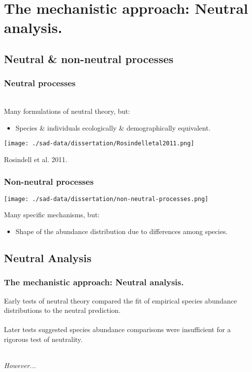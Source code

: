 \documentclass[14pt]{beamer}
\begin{document}
\section{The mechanistic approach: Neutral analysis.}
\subsection{Neutral & non-neutral processes}
\begin{frame}[t]
\frametitle{Neutral processes}
~\\
Many formulations of neutral theory, but:
~\\
\begin{itemize}
\item Species \& individuals ecologically \& demographically equivalent.\\
\end{itemize}
\texttt{[image: ./sad-data/dissertation/Rosindelletal2011.png]}\\
\begin{tiny}
Rosindell et al. 2011.
\end{tiny}
\end{frame}

\begin{frame}[t]
\frametitle{Non-neutral processes}
\begin{center}
\texttt{[image: ./sad-data/dissertation/non-neutral-processes.png]}\\
\end{center}
Many specific mechanisms, but:
~\\
\begin{itemize}
\item Shape of the abundance distribution due to differences among species.\\
\end{itemize}
\end{frame}

\subsection{Neutral Analysis}
\begin{frame}
\frametitle{The mechanistic approach: Neutral analysis.}
Early tests of neutral theory compared the fit of empirical species abundance distributions to the neutral prediction.\\
~\\
Later tests suggested species abundance comparisons were insufficient for a rigorous test of neutrality.\\
~\\
\begin{Large}
\emph{However...}
\end{Large}
\end{frame}
\end{document}
